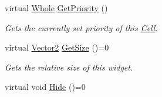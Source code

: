 \begin{DoxyCompactItemize}
virtual \hyperlink{namespacephys_a460f6bc24c8dd347b05e0366ae34f34a}{Whole} \hyperlink{classphys_1_1UI_1_1Cell_abb2a0c04c89df4a25cb5298c1a23e522}{GetPriority} ()
\begin{DoxyCompactList}\small\item\em Gets the currently set priority of this \hyperlink{classphys_1_1UI_1_1Cell}{Cell}. \item\end{DoxyCompactList}\item 
virtual \hyperlink{classphys_1_1Vector2}{Vector2} \hyperlink{classphys_1_1UI_1_1Cell_ab8288a97a63aad7cc02f32541b1b7351}{GetSize} ()=0
\begin{DoxyCompactList}\small\item\em Gets the relative size of this widget. \item\end{DoxyCompactList}\item 
\hypertarget{classphys_1_1UI_1_1Cell_a73b4c96e986bbd0f28cc542bcc4c8d7c}{
virtual void \hyperlink{classphys_1_1UI_1_1Cell_a73b4c96e986bbd0f28cc542bcc4c8d7c}{Hide} ()=0}
\label{classphys_1_1UI_1_1Cell_a73b4c96e986bbd0f28cc542bcc4c8d7c}


\end{DoxyCompactItemize}
